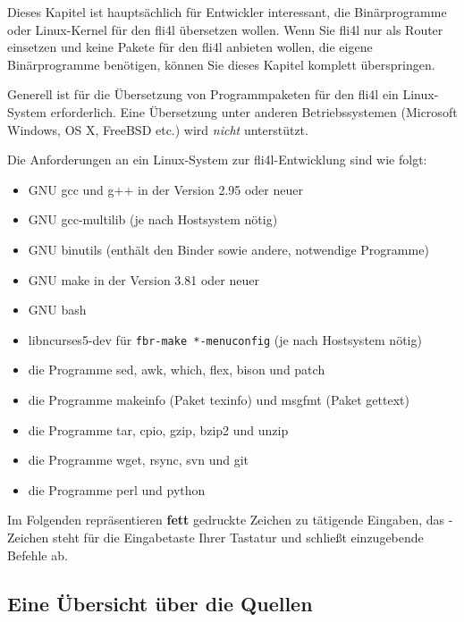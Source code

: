 
Dieses Kapitel ist hauptsächlich für Entwickler interessant, die Binärprogramme
oder Linux-Kernel für den fli4l übersetzen wollen. Wenn Sie fli4l nur als Router
einsetzen und keine Pakete für den fli4l anbieten wollen, die eigene
Binärprogramme benötigen, können Sie dieses Kapitel komplett überspringen.

Generell ist für die Übersetzung von Programmpaketen für den fli4l ein
Linux-System erforderlich. Eine Übersetzung unter anderen Betriebssystemen
(Microsoft Windows, OS X, FreeBSD etc.) wird \emph{nicht} unterstützt.

Die Anforderungen an ein Linux-System zur fli4l-Entwicklung sind wie folgt:
\begin{itemize}
\item GNU gcc und g++ in der Version 2.95 oder neuer
\item GNU gcc-multilib (je nach Hostsystem nötig)
\item GNU binutils (enthält den Binder sowie andere, notwendige Programme)
\item GNU make in der Version 3.81 oder neuer
\item GNU bash
\item libncurses5-dev für \texttt{fbr-make *-menuconfig} (je nach Hostsystem nötig)
\item die Programme sed, awk, which, flex, bison und patch
\item die Programme makeinfo (Paket texinfo) und msgfmt (Paket gettext)
\item die Programme tar, cpio, gzip, bzip2 und unzip
\item die Programme wget, rsync, svn und git
\item die Programme perl und python
\end{itemize}

Im Folgenden repräsentieren \textbf{fett} gedruckte Zeichen zu tätigende
Eingaben, das \enter-Zeichen steht für die Eingabetaste Ihrer Tastatur und
schließt einzugebende Befehle ab.

\subsection{Eine Übersicht über die Quellen}

